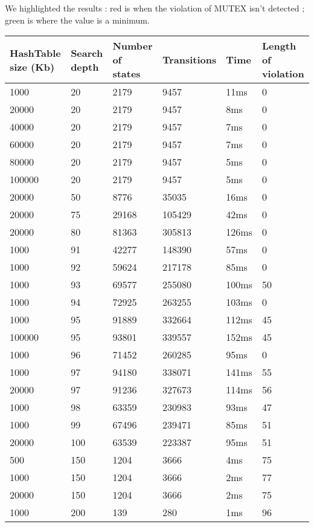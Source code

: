 We highlighted the results : red is when the violation of MUTEX isn't detected ; green is where the value is a minimum. 

\begin{longtable}{l|l|l|l|l|l}
HashTable size (Kb) & Search depth & Number of states & Transitions & Time & Length of violation \\
\hline
\rowcolor{red!40}1000 & 20 & 2179 & 9457 & 11ms & 0 \\
\rowcolor{red!40}20000 & 20 & 2179 & 9457 & 8ms & 0 \\
\rowcolor{red!40}40000 & 20 & 2179 & 9457 & 7ms & 0 \\
\rowcolor{red!40}60000 & 20 & 2179 & 9457 & 7ms & 0 \\
\rowcolor{red!40}80000 & 20 & 2179 & 9457 & 5ms & 0 \\
\rowcolor{red!40}100000 & 20 & 2179 & 9457 & 5ms & 0 \\
\rowcolor{red!40}20000 & 50 & 8776 & 35035 & 16ms & 0 \\
\rowcolor{red!40}20000 & 75 & 29168 & 105429 & 42ms & 0 \\
\rowcolor{red!40}20000 & 80 & 81363 & 305813 & 126ms & 0 \\
\rowcolor{red!40}1000 & 91 & 42277 & 148390 & 57ms & 0 \\
\rowcolor{red!40}1000 & 92 & 59624 & 217178 & 85ms & 0 \\
1000 & 93 & 69577 & 255080 & 100ms & 50 \\
\rowcolor{red!40}1000 & 94 & 72925 & 263255 & 103ms & 0 \\
1000 & 95 & 91889 & 332664 & 112ms & \cellcolor{green!40}45 \\
100000 & 95 & 93801 & 339557 & 152ms & \cellcolor{green!40}45 \\
\rowcolor{red!40}1000 & 96 & 71452 & 260285 & 95ms & 0 \\
1000 & 97 & 94180 & 338071 & 141ms & 55 \\
20000 & 97 & 91236 & 327673 & 114ms & 56 \\
1000 & 98 & 63359 & 230983 & 93ms & 47 \\
1000 & 99 & 67496 & 239471 & 85ms & 51 \\
20000 & 100 & 63539 & 223387 & 95ms & 51 \\
500 & 150 & 1204 & 3666 & 4ms & 75 \\
1000 & 150 & 1204 & 3666 & 2ms & 77 \\
20000 & 150 & 1204 & 3666 & 2ms & 75 \\
1000 & 200 & \cellcolor{green!40}139 & \cellcolor{green!40}280 & 1ms & 96 \\

\end{longtable}
